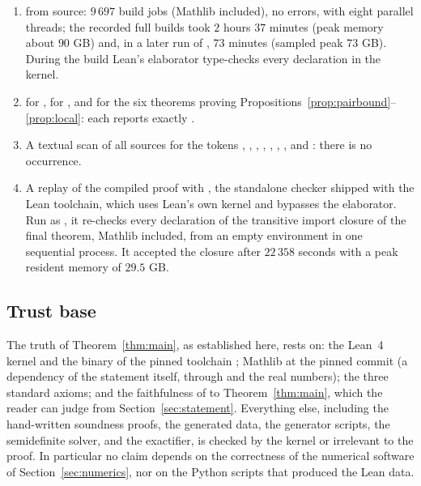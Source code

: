 \documentclass[11pt]{amsart}
\theoremstyle{definition}
\theoremstyle{remark}
\begin{document}
\begin{enumerate}
\item {} from source: $9\,697$ build jobs (Mathlib included), no errors, with eight parallel threads; the recorded full builds took $2$ hours $37$ minutes (peak memory about $90$ GB) and, in a later run of , $73$ minutes (sampled peak $73$ GB). During the build Lean's elaborator type-checks every declaration in the kernel.
\item {} for , for , and for the six theorems proving Propositions~\ref{prop:pairbound}--\ref{prop:local}: each reports exactly .
\item A textual scan of all sources for the tokens , , , , , , , and : there is no occurrence.
\item A replay of the compiled proof with , the standalone checker shipped with the Lean toolchain, which uses Lean's own kernel and bypasses the elaborator. Run as , it re-checks every declaration of the transitive import closure of the final theorem, Mathlib included, from an empty environment in one sequential process. It accepted the closure after $22\,358$ seconds with a peak resident memory of $29.5$ GB.
\end{enumerate}

\subsection{Trust base}

The truth of Theorem~\ref{thm:main}, as established here, rests on: the Lean~4 kernel and the  binary of the pinned toolchain \cite{Lean4}; Mathlib at the pinned commit \cite{Mathlib2020} (a dependency of the statement itself, through  and the real numbers); the three standard axioms; and the faithfulness of  to Theorem~\ref{thm:main}, which the reader can judge from Section~\ref{sec:statement}. Everything else, including the hand-written soundness proofs, the generated data, the generator scripts, the semidefinite solver, and the exactifier, is checked by the kernel or irrelevant to the proof. In particular no claim depends on the correctness of the numerical software of Section~\ref{sec:numerics}, nor on the Python scripts that produced the Lean data.
\end{document}
